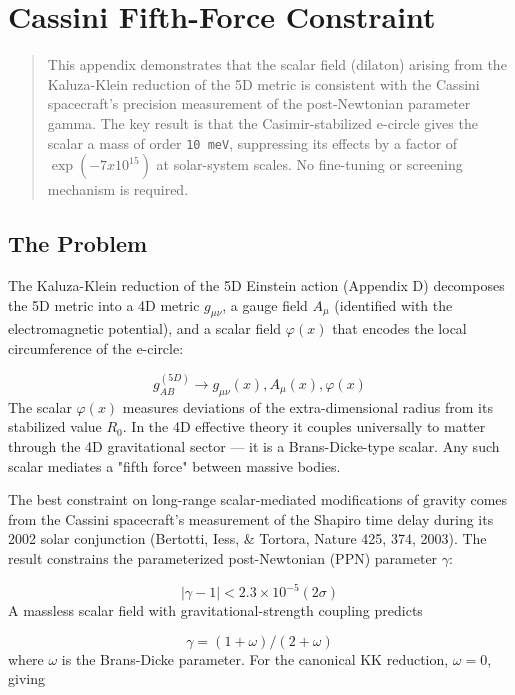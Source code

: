 \documentclass[aps,prd,preprint,superscriptaddress,longbibliography,floatfix]{revtex4-2}
\theoremstyle{remark}
\begin{document}
\section{Cassini Fifth-Force Constraint}


\begin{quote}
This appendix demonstrates that the scalar field (dilaton) arising from the
Kaluza-Klein reduction of the 5D metric is consistent with the Cassini
spacecraft's precision measurement of the post-Newtonian parameter gamma.
The key result is that the Casimir-stabilized e-circle gives the scalar a
mass of order \texttt{10 meV}, suppressing its effects by a factor of $\exp(-7 x 10^15)$
at solar-system scales. No fine-tuning or screening mechanism is required.
\end{quote}



\subsection{The Problem}

The Kaluza-Klein reduction of the 5D Einstein action (Appendix D) decomposes the 5D metric into a 4D metric $g_{\mu\nu}$, a gauge field $A_\mu$ (identified with the electromagnetic potential), and a scalar field $\varphi(x)$ that encodes the local circumference of the e-circle:


\begin{equation}
    g_{AB}^{(5D)} \to { g_{\mu\nu}(x),  A_\mu(x),  \varphi(x) }
\end{equation}
The scalar $\varphi(x)$ measures deviations of the extra-dimensional radius from its stabilized value $R_{0}$. In the 4D effective theory it couples universally to matter through the 4D gravitational sector --- it is a Brans-Dicke-type scalar. Any such scalar mediates a "fifth force" between massive bodies.

The best constraint on long-range scalar-mediated modifications of gravity comes from the Cassini spacecraft's measurement of the Shapiro time delay during its 2002 solar conjunction (Bertotti, Iess, \& Tortora, Nature 425, 374, 2003). The result constrains the parameterized post-Newtonian (PPN) parameter $\gamma$:


\begin{equation}
    |\gamma - 1| < 2.3 \times 10^{-5}     (2\sigma)
\end{equation}
A massless scalar field with gravitational-strength coupling predicts


\begin{equation}
    \gamma = (1 + \omega) / (2 + \omega)
\end{equation}
where $\omega$ is the Brans-Dicke parameter. For the canonical KK reduction, $\omega = 0$, giving
\end{document}
